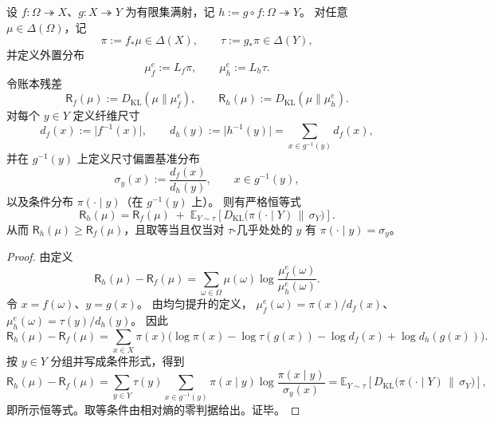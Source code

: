 \begin{theorem}\label{thm:pom-ledger-residual-stokes-increment}
设 \(f:\Omega\twoheadrightarrow X\)、\(g:X\twoheadrightarrow Y\) 为有限集满射，记 \(h:=g\circ f:\Omega\twoheadrightarrow Y\)。
对任意 \(\mu\in\Delta(\Omega)\)，记
\[
\pi:=f_\ast\mu\in\Delta(X),\qquad \tau:=g_\ast\pi\in\Delta(Y),
\]
并定义外置分布
\[
\mu_f^{e}:=L_f\pi,\qquad \mu_h^{e}:=L_h\tau.
\]
令账本残差
\[
\mathsf R_f(\mu):=D_{\mathrm{KL}}(\mu\|\mu_f^{e}),\qquad
\mathsf R_h(\mu):=D_{\mathrm{KL}}(\mu\|\mu_h^{e}).
\]
对每个 \(y\in Y\) 定义纤维尺寸
\[
d_f(x):=\lvert f^{-1}(x)\rvert,\qquad
d_h(y):=\lvert h^{-1}(y)\rvert=\sum_{x\in g^{-1}(y)}d_f(x),
\]
并在 \(g^{-1}(y)\) 上定义尺寸偏置基准分布
\[
\sigma_y(x):=\frac{d_f(x)}{d_h(y)},\qquad x\in g^{-1}(y),
\]
以及条件分布 \(\pi(\cdot\mid y)\)（在 \(g^{-1}(y)\) 上）。
则有严格恒等式
\[
\boxed{\;
\mathsf R_h(\mu)=\mathsf R_f(\mu)
\;+\;
\mathbb E_{Y\sim\tau}\!\left[D_{\mathrm{KL}}\bigl(\pi(\cdot\mid Y)\,\|\,\sigma_Y\bigr)\right].\;}
\]
从而 \(\mathsf R_h(\mu)\ge \mathsf R_f(\mu)\)，且取等当且仅当对 \(\tau\)-几乎处处的 \(y\) 有 \(\pi(\cdot\mid y)=\sigma_y\)。
\end{theorem}
\begin{proof}
由定义
\[
\mathsf R_h(\mu)-\mathsf R_f(\mu)
=\sum_{\omega\in\Omega}\mu(\omega)\log\frac{\mu_f^{e}(\omega)}{\mu_h^{e}(\omega)}.
\]
令 \(x=f(\omega)\)、\(y=g(x)\)。
由均匀提升的定义，
\(
\mu_f^{e}(\omega)=\pi(x)/d_f(x)
\)、
\(
\mu_h^{e}(\omega)=\tau(y)/d_h(y)
\)。
因此
\[
\mathsf R_h(\mu)-\mathsf R_f(\mu)
=\sum_{x\in X}\pi(x)\bigl(\log\pi(x)-\log\tau(g(x))-\log d_f(x)+\log d_h(g(x))\bigr).
\]
按 \(y\in Y\) 分组并写成条件形式，得到
\[
\mathsf R_h(\mu)-\mathsf R_f(\mu)
=\sum_{y\in Y}\tau(y)\sum_{x\in g^{-1}(y)}\pi(x\mid y)\log\frac{\pi(x\mid y)}{\sigma_y(x)}
=\mathbb E_{Y\sim\tau}\!\left[D_{\mathrm{KL}}\bigl(\pi(\cdot\mid Y)\,\|\,\sigma_Y\bigr)\right],
\]
即所示恒等式。取等条件由相对熵的零判据给出。证毕。
\end{proof}

